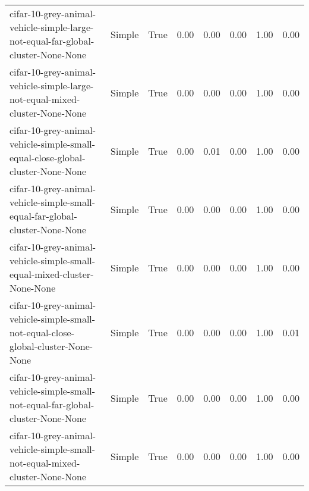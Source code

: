 \begin{longtable}{llllllll}
       cifar-10-grey-animal-vehicle-simple-large-not-equal-far-global-cluster-None-None &       Simple &        True &                 0.00 &                 0.00 &                         0.00 &                         1.00 &                         0.00 \\
            cifar-10-grey-animal-vehicle-simple-large-not-equal-mixed-cluster-None-None &       Simple &        True &                 0.00 &                 0.00 &                         0.00 &                         1.00 &                         0.00 \\
         cifar-10-grey-animal-vehicle-simple-small-equal-close-global-cluster-None-None &       Simple &        True &                 0.00 &                 0.01 &                         0.00 &                         1.00 &                         0.00 \\
           cifar-10-grey-animal-vehicle-simple-small-equal-far-global-cluster-None-None &       Simple &        True &                 0.00 &                 0.00 &                         0.00 &                         1.00 &                         0.00 \\
                cifar-10-grey-animal-vehicle-simple-small-equal-mixed-cluster-None-None &       Simple &        True &                 0.00 &                 0.00 &                         0.00 &                         1.00 &                         0.00 \\
     cifar-10-grey-animal-vehicle-simple-small-not-equal-close-global-cluster-None-None &       Simple &        True &                 0.00 &                 0.00 &                         0.00 &                         1.00 &                         0.01 \\
       cifar-10-grey-animal-vehicle-simple-small-not-equal-far-global-cluster-None-None &       Simple &        True &                 0.00 &                 0.00 &                         0.00 &                         1.00 &                         0.00 \\
            cifar-10-grey-animal-vehicle-simple-small-not-equal-mixed-cluster-None-None &       Simple &        True &                 0.00 &                 0.00 &                         0.00 &                         1.00 &                         0.00 \\
\end{longtable}
